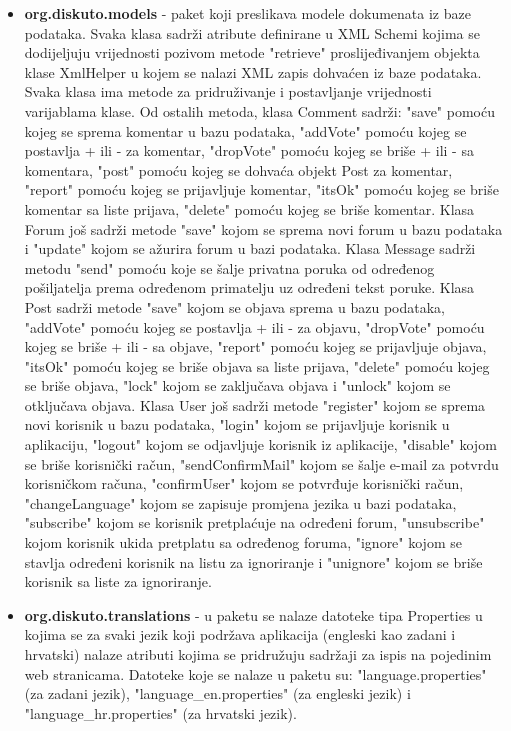 \documentclass{foi}
\begin{document}
\begin{itemize}
\item \textbf{org.diskuto.models} - paket koji preslikava modele dokumenata iz baze podataka. Svaka klasa sadrži atribute definirane u XML Schemi kojima se dodijeljuju vrijednosti pozivom metode "retrieve" proslijeđivanjem objekta klase XmlHelper u kojem se nalazi XML zapis dohvaćen iz baze podataka. Svaka klasa ima metode za pridruživanje i postavljanje vrijednosti varijablama klase. Od ostalih metoda, klasa Comment sadrži: "save" pomoću kojeg se sprema komentar u bazu podataka, "addVote" pomoću kojeg se postavlja + ili - za komentar, "dropVote" pomoću kojeg se briše + ili - sa komentara, "post" pomoću kojeg se dohvaća objekt Post za komentar, "report" pomoću kojeg se prijavljuje komentar, "itsOk" pomoću kojeg se briše komentar sa liste prijava, "delete" pomoću kojeg se briše komentar. Klasa Forum još sadrži metode "save" kojom se sprema novi forum u bazu podataka i "update" kojom se ažurira forum u bazi podataka. Klasa Message sadrži metodu "send" pomoću koje se šalje privatna poruka od određenog pošiljatelja prema određenom primatelju uz određeni tekst poruke. Klasa Post sadrži metode "save" kojom se objava sprema u bazu podataka, "addVote" pomoću kojeg se postavlja + ili - za objavu, "dropVote" pomoću kojeg se briše + ili - sa objave, "report" pomoću kojeg se prijavljuje objava, "itsOk" pomoću kojeg se briše objava sa liste prijava, "delete" pomoću kojeg se briše objava, "lock" kojom se zaključava objava i "unlock" kojom se otključava objava. Klasa User još sadrži metode "register" kojom se sprema novi korisnik u bazu podataka, "login" kojom se prijavljuje korisnik u aplikaciju, "logout" kojom se odjavljuje korisnik iz aplikacije, "disable" kojom se briše korisnički račun, "sendConfirmMail" kojom se šalje e-mail za potvrdu korisničkom računa, "confirmUser" kojom se potvrđuje korisnički račun, "changeLanguage" kojom se zapisuje promjena jezika u bazi podataka, "subscribe" kojom se korisnik pretplaćuje na određeni forum, "unsubscribe" kojom korisnik ukida pretplatu sa određenog foruma, "ignore" kojom se stavlja određeni korisnik na listu za ignoriranje i "unignore" kojom se briše korisnik sa liste za ignoriranje.
\item \textbf{org.diskuto.translations} - u paketu se nalaze datoteke tipa Properties u kojima se za svaki jezik koji podržava aplikacija (engleski kao zadani i hrvatski) nalaze atributi kojima se pridružuju sadržaji za ispis na pojedinim web stranicama. Datoteke koje se nalaze u paketu su: "language.properties" (za zadani jezik), "language\_en.properties" (za engleski jezik) i "language\_hr.properties" (za hrvatski jezik).
\end{itemize}
\end{document}
